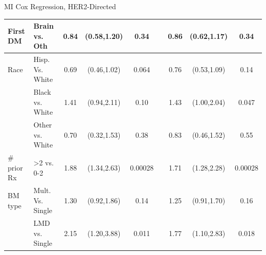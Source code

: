 \begin{frame}{MI Cox Regression, HER2-Directed}
\begin{table}[]
{\begin{tabular}{|l|l|c|c|c|c|c|c|c|}
First DM                       & Brain vs. Oth                    & 0.84                  & (0.58,1.20)                                        & 0.34                  &                       & 0.86 & (0.62,1.17)                                                          & 0.34                                                        \\ \hline
Race                           & Hisp. Vs. White                  & 0.69                  & (0.46,1.02)                                        & 0.064                 &                       & 0.76 & (0.53,1.09)                                                          & 0.14                                                        \\ \hline
                               & Black vs. White                  & 1.41                  & (0.94,2.11)                                        & 0.10                   &                       & 1.43 & (1.00,2.04)                                                          & 0.047                                                       \\ \hline
                               & Other vs. White                  & 0.70                   & (0.32,1.53)                                        & 0.38                  &                       & 0.83 & (0.46,1.52)                                                          & 0.55                                                        \\ \hline
\# prior Rx                    & \textgreater2 vs. 0-2            & 1.88                  & (1.34,2.63)                                        & 0.00028               &                       & 1.71 & (1.28,2.28)                                                          & 0.00028                                                     \\ \hline
BM type                        & Mult. Vs. Single                 & 1.30                   & (0.92,1.86)                                        & 0.14                  &                       & 1.25 & (0.91,1.70)                                                          & 0.16                                                        \\ \hline
                               & LMD vs. Single                   & 2.15                  & (1.20,3.88)                                        & 0.011                 &                       & 1.77 & (1.10,2.83)                                                          & 0.018                                                       \\ \hline

\end{tabular}}
\end{table}
\end{frame}
